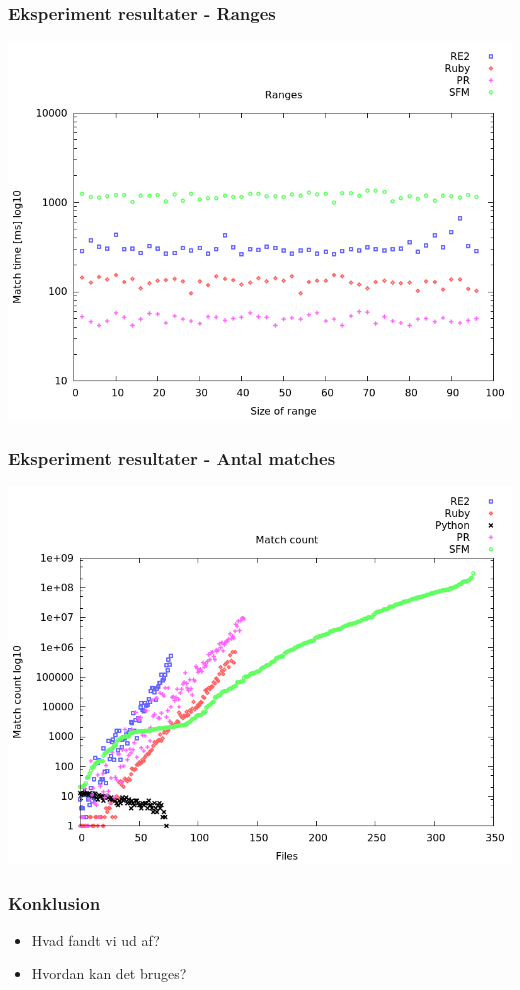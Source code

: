 \documentclass{beamer}
\begin{document}
\begin{frame}
	\frametitle{Eksperiment resultater - Ranges}
	
	\begin{center}
		\includegraphics[scale=0.3]{../rapport/graphs/ranges.png}
	\end{center}
\end{frame}

\begin{frame}
	\frametitle{Eksperiment resultater - Antal matches}
	
	\begin{center}
		\includegraphics[scale=0.3]{../rapport/graphs/match_count.png}
	\end{center}
\end{frame}

\begin{frame}
	\frametitle{Konklusion}
	
	\begin{itemize}
		\item Hvad fandt vi ud af?
		\item Hvordan kan det bruges?
	\end{itemize}
\end{frame}
\end{document}
